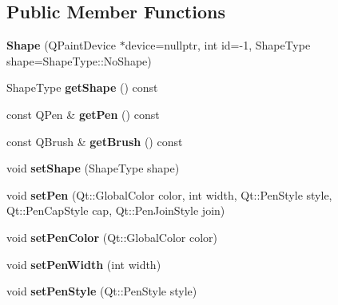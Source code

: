 \subsection*{Public Member Functions}
\begin{DoxyCompactItemize}
\item 
\mbox{\label{class_shapes_1_1_shape_a0dde7c106fa6ebbb9449ed4b116df1f1}} 
{\bfseries Shape} (Q\+Paint\+Device $\ast$device=nullptr, int id=-\/1, Shape\+Type shape=Shape\+Type\+::\+No\+Shape)
\item 
\mbox{\label{class_shapes_1_1_shape_aed92280d4653c351877f2b8bf3afe71a}} 
Shape\+Type {\bfseries get\+Shape} () const
\item 
\mbox{\label{class_shapes_1_1_shape_a36626740992caa7eeb58d70efb9174c4}} 
const Q\+Pen \& {\bfseries get\+Pen} () const
\item 
\mbox{\label{class_shapes_1_1_shape_a255da1a57c86e174814a7a2362d9d80f}} 
const Q\+Brush \& {\bfseries get\+Brush} () const
\item 
\mbox{\label{class_shapes_1_1_shape_a610d97f732d655186a3cafa63b6f19fb}} 
void {\bfseries set\+Shape} (Shape\+Type shape)
\item 
\mbox{\label{class_shapes_1_1_shape_ada46ca72c24ad759c476d6e4b6b344d7}} 
void {\bfseries set\+Pen} (Qt\+::\+Global\+Color color, int width, Qt\+::\+Pen\+Style style, Qt\+::\+Pen\+Cap\+Style cap, Qt\+::\+Pen\+Join\+Style join)
\item 
\mbox{\label{class_shapes_1_1_shape_a5af22342bce235ef7a5832c63dec89e2}} 
void {\bfseries set\+Pen\+Color} (Qt\+::\+Global\+Color color)
\item 
\mbox{\label{class_shapes_1_1_shape_a2b4bcf8ac40f393eaf398bb73445ea0d}} 
void {\bfseries set\+Pen\+Width} (int width)
\item 
\mbox{\label{class_shapes_1_1_shape_a2650b1d4a692ea21dc3f17fff0cf2048}} 
void {\bfseries set\+Pen\+Style} (Qt\+::\+Pen\+Style style)

\end{DoxyCompactItemize}
